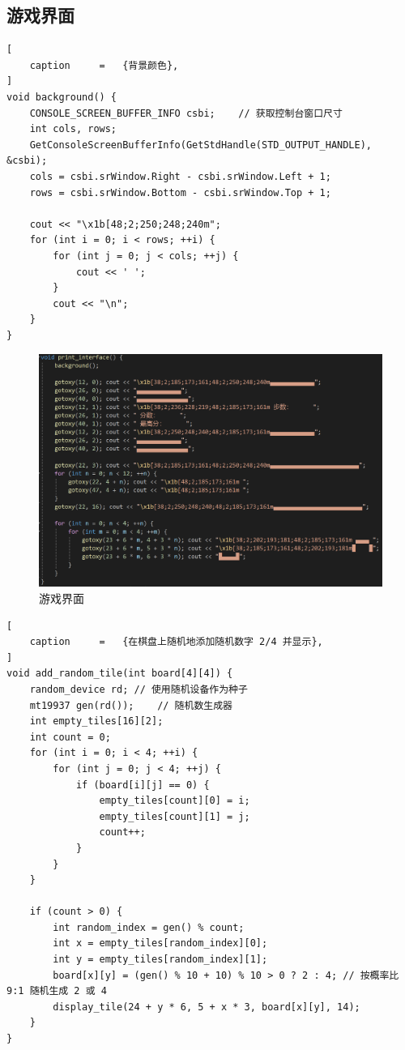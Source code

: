 \documentclass[12pt,a4paper,twoside]{ctexart}
\numberwithin{figure}{section}
\numberwithin{equation}{section}
\begin{document}
\subsection{游戏界面}
\begin{lstlisting}[
    caption     =   {背景颜色},
]
void background() {
    CONSOLE_SCREEN_BUFFER_INFO csbi;    // 获取控制台窗口尺寸
    int cols, rows;
    GetConsoleScreenBufferInfo(GetStdHandle(STD_OUTPUT_HANDLE), &csbi);
    cols = csbi.srWindow.Right - csbi.srWindow.Left + 1;
    rows = csbi.srWindow.Bottom - csbi.srWindow.Top + 1;

    cout << "\x1b[48;2;250;248;240m";
    for (int i = 0; i < rows; ++i) {
        for (int j = 0; j < cols; ++j) {
            cout << ' ';
        }
        cout << "\n";
    }
}
\end{lstlisting}

\begin{figure}[ht]
    \centering
    \includegraphics[width=.6\textwidth]{interface.png}
    \caption{游戏界面}
\end{figure}

\begin{lstlisting}[
    caption     =   {在棋盘上随机地添加随机数字 2/4 并显示},
]
void add_random_tile(int board[4][4]) {
    random_device rd; // 使用随机设备作为种子
    mt19937 gen(rd());    // 随机数生成器
    int empty_tiles[16][2];
    int count = 0;
    for (int i = 0; i < 4; ++i) {
        for (int j = 0; j < 4; ++j) {
            if (board[i][j] == 0) {
                empty_tiles[count][0] = i;
                empty_tiles[count][1] = j;
                count++;
            }
        }
    }

    if (count > 0) {
        int random_index = gen() % count;
        int x = empty_tiles[random_index][0];
        int y = empty_tiles[random_index][1];
        board[x][y] = (gen() % 10 + 10) % 10 > 0 ? 2 : 4; // 按概率比 9:1 随机生成 2 或 4
        display_tile(24 + y * 6, 5 + x * 3, board[x][y], 14);
    }
}
\end{lstlisting}
\end{document}

